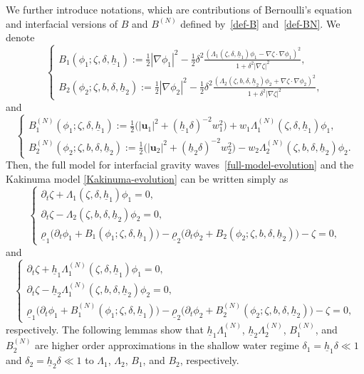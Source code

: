 \documentclass[11pt,leqno]{article}
\numberwithin{equation}{section}
\numberwithin{figure}{section}
\begin{document}
We further introduce notations, which are contributions of Bernoulli's equation and interfacial versions of 
$B$ and $B^{(N)}$ defined by~\eqref{def-B} and~\eqref{def-BN}. 
We denote 
%
\[
\begin{cases}
 \displaystyle
 B_1(\phi_1;\zeta,\delta,\underline{h}_1)
 := \frac12|\nabla\phi_1|^2 - \frac12\delta^{2}
  \frac{(\Lambda_1(\zeta,\delta,\underline{h}_1)\phi_1-\nabla\zeta\cdot\nabla\phi_1)^2}{1+\delta^2|\nabla\zeta|^2}, \\
 \displaystyle
 B_2(\phi_2;\zeta,b,\delta,\underline{h}_2)
 := \frac12|\nabla\phi_2|^2 - \frac12\delta^{2}
  \frac{(\Lambda_2(\zeta,b,\delta,\underline{h}_2)\phi_2+\nabla\zeta\cdot\nabla\phi_2)^2}{1+\delta^2|\nabla\zeta|^2},
\end{cases}
\]
%
and 
%
\[
\begin{cases}
 \displaystyle
 B_1^{(N)}(\phi_1;\zeta,\delta,\underline{h}_1)
 := \frac12\bigl( |\bm{u}_1|^2 + (\underline{h}_1\delta)^{-2} w_1^2 \bigr)
  + w_1\Lambda_1^{(N)}(\zeta,\delta,\underline{h}_1)\phi_1, \\
 \displaystyle
 B_2^{(N)}(\phi_2;\zeta,b,\delta,\underline{h}_2)
 := \frac12\bigl( |\bm{u}_2|^2 + (\underline{h}_2\delta)^{-2} w_2^2 \bigr)
  - w_2\Lambda_2^{(N)}(\zeta,b,\delta,\underline{h}_2)\phi_2. 
\end{cases}
\]
%
Then, the full model for interfacial gravity waves~\eqref{full-model-evolution} and the Kakinuma model
\eqref{Kakinuma-evolution} can be written simply as 
%
\[
\begin{cases}
 \partial_t\zeta + \Lambda_1(\zeta,\delta,\underline{h}_1)\phi_1 =0, \\
 \partial_t\zeta - \Lambda_2(\zeta,b,\delta,\underline{h}_2)\phi_2 =0, \\
 \displaystyle
 \underline{\rho}_1\bigl( \partial_t\phi_1 + B_1(\phi_1;\zeta,\delta,\underline{h}_1) \bigr) 
 - \underline{\rho}_2\bigl( \partial_t\phi_2 + B_2(\phi_2;\zeta,b,\delta,\underline{h}_2) \bigr)
 - \zeta = 0,
\end{cases}
\]
%
and 
%
\[
\begin{cases}
 \partial_t\zeta + \underline{h}_1\Lambda_1^{(N)}(\zeta,\delta,\underline{h}_1)\phi_1 = 0, \\
 \partial_t\zeta - \underline{h}_2\Lambda_1^{(N)}(\zeta,b,\delta,\underline{h}_2)\phi_2 = 0, \\
 \underline{\rho}_1\bigl( \partial_t\phi_1 + B_1^{(N)}(\phi_1;\zeta,\delta,\underline{h}_1) \bigr) 
 - \underline{\rho}_2\bigl( \partial_t\phi_2 + B_2^{(N)}(\phi_2;\zeta,b,\delta,\underline{h}_2) \bigr)
 - \zeta = 0,
\end{cases}
\]
%
respectively. 
The following lemmas show that $\underline{h}_1\Lambda_1^{(N)}$, $\underline{h}_2\Lambda_2^{(N)}$, $B_1^{(N)}$, 
and $B_2^{(N)}$ are higher order approximations in the shallow water regime $\delta_1=\underline{h}_1\delta\ll1$ 
and $\delta_2=\underline{h}_2\delta\ll1$ to $\Lambda_1$, $\Lambda_2$, $B_1$, and $B_2$, respectively. 
\end{document}
